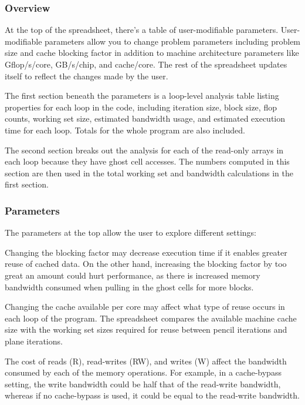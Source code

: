 \documentclass{article}
\begin{document}
\subsubsection{Overview}

At the top of the spreadsheet, there's a table of user-modifiable
parameters.  User-modifiable parameters allow you to change problem
parameters including problem size and cache blocking factor in addition
to machine architecture parameters like Gflop/s/core, GB/s/chip,
and cache/core.  The rest of the spreadsheet updates itself to reflect
the changes made by the user.

The first section beneath the parameters is a loop-level analysis table
listing properties for each loop in the code, including iteration size,
block size, flop counts, working set size, estimated bandwidth usage,
and estimated execution time for each loop.  Totals for the whole program
are also included.

The second section breaks out the analysis for each of the read-only
arrays in each loop because they have ghost cell accesses.  The numbers
computed in this section are then used in the total working set and
bandwidth calculations in the first section.

\subsubsection{Parameters}

The parameters at the top allow the user to explore different settings:

Changing the blocking factor may decrease execution time if it enables
greater reuse of cached data.  On the other hand, increasing the
blocking factor by too great an amount could hurt performance, as there
is increased memory bandwidth consumed when pulling in the ghost cells
for more blocks.

Changing the cache available per core may affect what type of reuse
occurs in each loop of the program.  The spreadsheet compares the
available machine cache size with the working set sizes required for
reuse between pencil iterations and plane iterations.

The cost of reads (R), read-writes (RW), and writes (W) affect the
bandwidth consumed by each of the memory operations.  For example, in
a cache-bypass setting, the write bandwidth could be half that of the
read-write bandwidth, whereas if no cache-bypass is used, it could be
equal to the read-write bandwidth.
\end{document}
